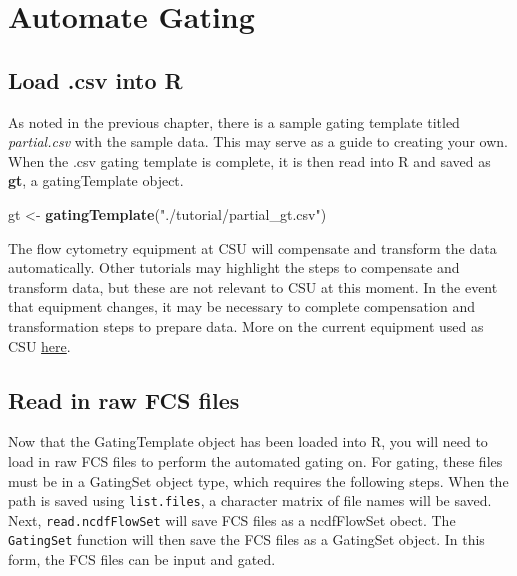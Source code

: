 \documentclass[]{book}
\newenvironment{Shaded}{\begin{snugshade}}{\end{snugshade}}
\newcommand{\KeywordTok}[1]{\textcolor[rgb]{0.13,0.29,0.53}{\textbf{#1}}}
\newcommand{\NormalTok}[1]{#1}
\newcommand{\StringTok}[1]{\textcolor[rgb]{0.31,0.60,0.02}{#1}}
\begin{document}
\hypertarget{automate-gating}{%
\chapter{Automate Gating}\label{automate-gating}}

\hypertarget{load-.csv-into-r}{%
\section{Load .csv into R}\label{load-.csv-into-r}}

As noted in the previous chapter, there is a sample gating template titled \emph{partial.csv} with the sample data. This may serve as a guide to creating your own. When the .csv gating template is complete, it is then read into R and saved as \textbf{gt}, a gatingTemplate object.

\begin{Shaded}
\begin{Highlighting}[]
\NormalTok{gt <-}\StringTok{ }\KeywordTok{gatingTemplate}\NormalTok{(}\StringTok{"./tutorial/partial_gt.csv"}\NormalTok{)}
\end{Highlighting}
\end{Shaded}

The flow cytometry equipment at CSU will compensate and transform the data automatically. Other tutorials may highlight the steps to compensate and transform data, but these are not relevant to CSU at this moment. In the event that equipment changes, it may be necessary to complete compensation and transformation steps to prepare data. More on the current equipment used as CSU \href{https://www.umassmed.edu/facslab/instrument/core-cytek-aurora2/}{here}.

\hypertarget{read-in-raw-fcs-files}{%
\section{Read in raw FCS files}\label{read-in-raw-fcs-files}}

Now that the GatingTemplate object has been loaded into R, you will need to load in raw FCS files to perform the automated gating on. For gating, these files must be in a GatingSet object type, which requires the following steps. When the path is saved using \texttt{list.files}, a character matrix of file names will be saved. Next, \texttt{read.ncdfFlowSet} will save FCS files as a ncdfFlowSet obect. The \texttt{GatingSet} function will then save the FCS files as a GatingSet object. In this form, the FCS files can be input and gated.
\end{document}

